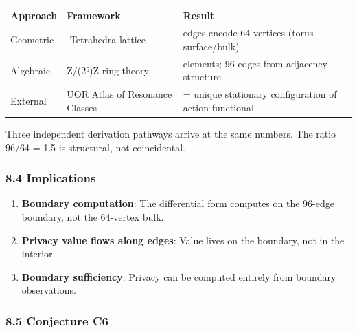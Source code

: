 \documentclass[
  11pt,
]{article}
\newcounter{none} %
\providecommand{\tightlist}{%
  \setlength{\itemsep}{0pt}\setlength{\parskip}{0pt}}
\begin{document}
{\def\LTcaptype{none} %
\begin{longtable}[]{@{}
  >{\raggedright\arraybackslash}p{}
  >{\raggedright\arraybackslash}p{}
  >{\raggedright\arraybackslash}p{}@{}}
\toprule\noalign{}
\begin{minipage}[b]{\linewidth}\raggedright
Approach
\end{minipage} & \begin{minipage}[b]{\linewidth}\raggedright
Framework
\end{minipage} & \begin{minipage}[b]{\linewidth}\raggedright
Result
\end{minipage} \\
\midrule\noalign{}
\endhead
\bottomrule\noalign{}
\endlastfoot
Geometric & 64-Tetrahedra lattice & 96 edges encode 64 vertices (torus
surface/bulk) \\
Algebraic & Z/(2⁶)Z ring theory & 64 elements; 96 edges from adjacency
structure \\
External & UOR Atlas of Resonance Classes & 96 = unique stationary
configuration of action functional \\
\end{longtable}
}

Three independent derivation pathways arrive at the same numbers. The
ratio 96/64 = 1.5 is structural, not coincidental.

\subsubsection{8.4 Implications}\label{implications}

\begin{enumerate}
\def\labelenumi{\arabic{enumi}.}
\tightlist
\item
  \textbf{Boundary computation}: The differential form computes on the
  96-edge boundary, not the 64-vertex bulk.
\item
  \textbf{Privacy value flows along edges}: Value lives on the boundary,
  not in the interior.
\item
  \textbf{Boundary sufficiency}: Privacy can be computed entirely from
  boundary observations.
\end{enumerate}

\subsubsection{8.5 Conjecture C6}\label{conjecture-c6}
\end{document}
